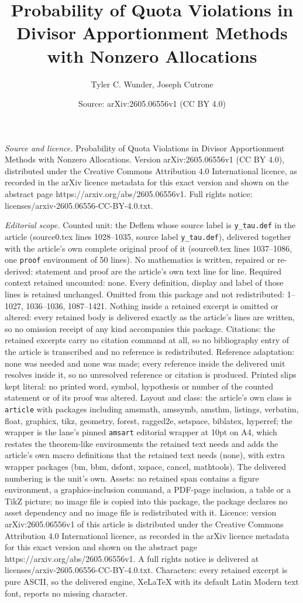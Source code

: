 \documentclass[10pt,a4paper]{amsart}
\title[Probability of Quota Violations in Divisor Apportionment Met]{Probability of Quota Violations in Divisor Apportionment Methods with Nonzero Allocations}
\author{Tyler C. Wunder, Joseph Cutrone}
\date{Source: arXiv:2605.06556v1 (CC BY 4.0)}
\begin{document}
\maketitle

\noindent\emph{Source and licence.} Probability of Quota Violations in Divisor Apportionment Methods with Nonzero Allocations. Version arXiv:2605.06556v1 (CC BY 4.0), distributed under the Creative Commons Attribution 4.0 International licence, as recorded in the arXiv licence metadata for this exact version and shown on the abstract page https://arxiv.org/abs/2605.06556v1. Full rights notice: licenses/arxiv-2605.06556-CC-BY-4.0.txt.\par\smallskip

\noindent\textit{Editorial scope.} Counted unit: the Deflem whose source label is \texttt{y\_tau.def} in the article (source0.tex lines 1028--1035, source label \texttt{y\_tau.def}), delivered together with the article's own complete original proof of it (source0.tex lines 1037--1086, one \texttt{proof} environment of 50 lines). No mathematics is written, repaired or re-derived: statement and proof are the article's own text line for line. Required context retained uncounted: none. Every definition, display and label of those lines is retained unchanged. Omitted from this package and not redistributed: 1--1027, 1036--1036, 1087--1421. Nothing inside a retained excerpt is omitted or altered: every retained body is delivered exactly as the article's lines are written, so no omission receipt of any kind accompanies this package. Citations: the retained excerpts carry no citation command at all, so no bibliography entry of the article is transcribed and no reference is redistributed. Reference adaptation: none was needed and none was made; every reference inside the delivered unit resolves inside it, so no unresolved reference or citation is produced. Printed slips kept literal: no printed word, symbol, hypothesis or number of the counted statement or of its proof was altered. Layout and class: the article's own class is \texttt{article} with packages including amsmath, amssymb, amsthm, listings, verbatim, float, graphicx, tikz, geometry, forest, ragged2e, setspace, biblatex, hyperref; the wrapper is the lane's pinned \texttt{amsart} editorial wrapper at 10pt on A4, which restates the theorem-like environments the retained text needs and adds the article's own macro definitions that the retained text needs (none), with extra wrapper packages (bm, bbm, dsfont, xspace, cancel, mathtools). The delivered numbering is the unit's own. Assets: no retained span contains a figure environment, a graphics-inclusion command, a PDF-page inclusion, a table or a TikZ picture; no image file is copied into this package, the package declares no asset dependency and no image file is redistributed with it. Licence: version arXiv:2605.06556v1 of this article is distributed under the Creative Commons Attribution 4.0 International licence, as recorded in the arXiv licence metadata for this exact version and shown on the abstract page https://arxiv.org/abs/2605.06556v1. A full rights notice is delivered at licenses/arxiv-2605.06556-CC-BY-4.0.txt. Characters: every retained excerpt is pure ASCII, so the delivered engine, XeLaTeX with its default Latin Modern text font, reports no missing character.
\end{document}
